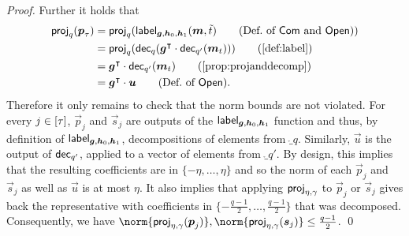 \begin{proof}
Further it holds that
\begin{align*}
  \projmod{q}(\vec{p}_{\tau})
  ={}&\projmod{q}(\lbl_{\vec{g},\vec{h}_0,\vec{h}_1}(\vec{m},\tilde t)\tag{Def.\ of $\commit$ and $\open$})\\
  ={}&\projmod{q}(\decompmod{q}(\vec{g}^\transpose\cdot \decompmod{q'}(\vec{m}_t)))\tag{\autoref{def:label}}\\
  ={}&\vec{g}^\transpose\cdot \decompmod{q'}(\vec{m}_t)\tag{\autoref{prop:projanddecomp}}\\
  ={}&\vec{g}^\transpose\cdot\vec{u}\tag{Def.\ of $\open$}.
\end{align*}
%
Therefore it only remains to check that the norm bounds are not violated.
For every $j\in[\tau]$, $\vec{p}_j$ and $\vec{s}_j$ are outputs of the $\mathsf{label}_{\boldsymbol{g},\boldsymbol{h}_0,\boldsymbol{h}_1}$ function and thus, by definition of $\mathsf{label}_{\boldsymbol{g},\boldsymbol{h}_0,\boldsymbol{h}_1}$, decompositions of elements from $\ring_q$.
Similarly, $\vec{u}$ is the output of $\mathsf{dec}_{q'}$, applied to a vector of elements from $\ring_{q'}$.
By design, this implies that the resulting coefficients are in $\{-\eta,\dots,\eta\}$ and so the norm of each $\vec{p}_j$ and $\vec{s}_j$ as well as $\vec{u}$ is at most $\eta$.
It also implies that applying $\mathsf{proj}_{\eta,\gamma}$ to $\vec{p}_j$ or $\vec{s}_j$ gives back the representative with coefficients in $\{-\tfrac{q-1}{2},\ldots,\tfrac{q-1}{2}\}$ that was decomposed.
Consequently, we have $\norm{\projring(\vec{p}_j)}, \norm{\projring(\vec{s}_j)} \leq \tfrac{q-1}{2}$.
\qed
\end{proof}

